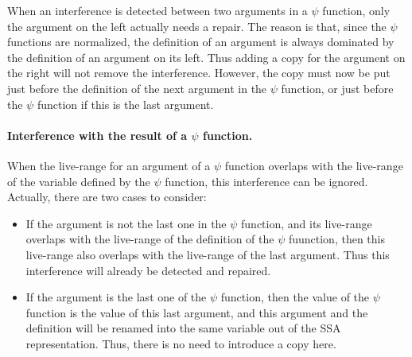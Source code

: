 When an interference is detected between two arguments in a $\psi$
function, only the argument on the left actually needs a repair. The
reason is that, since the $\psi$ functions are normalized, the
definition of an argument is always dominated by the definition of an
argument on its left. Thus adding a copy for the argument on the right
will not remove the interference. However, the copy must now be put
just before the definition of the next argument in the $\psi$
function, or just before the $\psi$ function if this is the last
argument.

\paragraph{Interference with the result of a $\psi$ function.}

When the live-range for an argument of a $\psi$ function overlaps
with the live-range of the variable defined by the $\psi$ function,
this interference can be ignored. Actually, there are two cases to
consider:

\begin{itemize}
\item If the argument is not the last one in the $\psi$ function, and
its live-range overlaps with the live-range of the definition of the
$\psi$ fuunction, then this live-range also overlaps with the
live-range of the last argument. Thus this interference will already
be detected and repaired.

\item If the argument is the last one of the $\psi$ function, then
the value of the $\psi$ function is the value of this last argument,
and this argument and the definition will be renamed into the same
variable out of the SSA representation. Thus, there is no need to
introduce a copy here.
\end{itemize}

